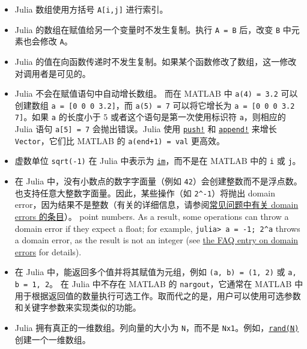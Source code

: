 \begin{itemize}
\item Julia 数组使用方括号 \texttt{A[i,j]} 进行索引。


\item Julia 的数组在赋值给另一个变量时不发生复制。执行 \texttt{A = B} 后，改变 \texttt{B} 中元素也会修改 \texttt{A}。


\item Julia 的值在向函数传递时不发生复制。如果某个函数修改了数组，这一修改对调用者是可见的。


\item Julia 不会在赋值语句中自动增长数组。 而在 MATLAB 中 \texttt{a(4) = 3.2} 可以创建数组 \texttt{a = [0 0 0 3.2]}，而 \texttt{a(5) = 7} 可以将它增长为 \texttt{a = [0 0 0 3.2 7]}。如果 \texttt{a} 的长度小于 5 或者这个语句是第一次使用标识符 \texttt{a}，则相应的 Julia 语句 \texttt{a[5] = 7} 会抛出错误。Julia 使用 \hyperlink{18026893834387542681}{\texttt{push!}} 和 \hyperlink{2587432243763606566}{\texttt{append!}} 来增长 \texttt{Vector}，它们比 MATLAB 的 \texttt{a(end+1) = val} 更高效。


\item 虚数单位 \texttt{sqrt(-1)} 在 Julia 中表示为 \hyperlink{15097910740298861288}{\texttt{im}}，而不是在 MATLAB 中的 \texttt{i} 或 \texttt{j}。


\item 在 Julia 中，没有小数点的数字字面量（例如 \texttt{42}）会创建整数而不是浮点数。也支持任意大整数字面量。因此，某些操作（如 \texttt{2{\textasciicircum}-1}）将抛出 domain error，因为结果不是整数（有关的详细信息，请参阅\hyperlink{1677964623674152967}{常见问题中有关 domain errors 的条目}）。 point numbers. As a result, some operations can throw a domain error if they expect a float; for example, \texttt{julia> a = -1; 2{\textasciicircum}a} throws a domain error, as the result is not an integer (see \hyperlink{1677964623674152967}{the FAQ entry on domain errors} for details).


\item 在 Julia 中，能返回多个值并将其赋值为元组，例如 \texttt{(a, b) = (1, 2)} 或 \texttt{a, b = 1, 2}。 在 Julia 中不存在 MATLAB 的 \texttt{nargout}，它通常在 MATLAB 中用于根据返回值的数量执行可选工作。取而代之的是，用户可以使用可选参数和关键字参数来实现类似的功能。


\item Julia 拥有真正的一维数组。列向量的大小为 \texttt{N}，而不是 \texttt{Nx1}。例如，\hyperlink{7668863842145012694}{\texttt{rand(N)}} 创建一个一维数组。



\end{itemize}
